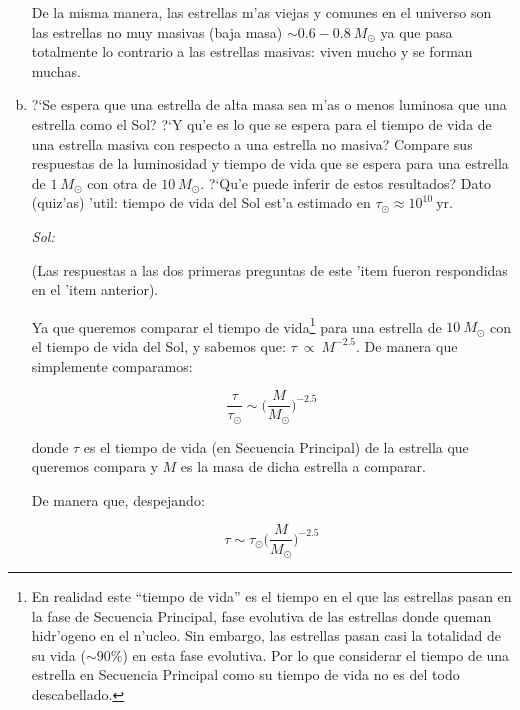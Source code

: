 \documentclass{article}
\begin{document}
\begin{enumerate}[a)]
De la misma manera, las estrellas m'as viejas y comunes en el universo son las estrellas no muy masivas (baja masa) $\sim 0.6-0.8 \ M_\odot$ ya que pasa totalmente lo contrario a las estrellas masivas: viven mucho y se forman muchas.


\item ?`Se espera que una estrella de alta masa sea m'as o menos luminosa que una estrella como el Sol? ?`Y qu'e es lo que se espera para el tiempo de vida de una estrella masiva con respecto a una estrella no masiva? Compare sus respuestas de la luminosidad y tiempo de vida que se espera para una estrella de $1 \ M_\odot$ con otra de $10 \ M_\odot$. ?`Qu'e puede inferir de estos resultados? Dato (quiz'as) 'util: %
tiempo de vida del Sol est'a estimado en $\tau_\odot \approx 10^{10} \ \text{yr}$.

\vspace{2mm}
\emph{Sol:}
\vspace{2mm}

(Las respuestas a las dos primeras  preguntas de este 'item fueron respondidas en el 'item anterior).

Ya que queremos comparar el tiempo de vida\footnote{En realidad este ``tiempo de vida'' es el tiempo en el que las estrellas pasan en la fase de Secuencia Principal, fase evolutiva de las estrellas donde queman hidr'ogeno en el n'ucleo. Sin embargo, las estrellas pasan casi la totalidad de su vida ($\sim 90\%$) en esta fase evolutiva. Por lo que considerar el tiempo de una estrella en Secuencia Principal como su tiempo de vida no es del todo descabellado.} para una estrella de $10 \ M_\odot$ con el tiempo de vida del Sol, y sabemos que: $\tau \ \propto \ M^{-2.5}$. De manera que simplemente comparamos:

\begin{equation}
\frac{\tau}{\tau_\odot} \sim \bigg( \frac{M}{M_\odot} \bigg)^{-2.5}
\end{equation}

donde $\tau$ es el tiempo de vida (en Secuencia Principal) de la estrella que queremos compara y $M$ es la masa de dicha estrella a comparar.

De manera que, despejando:

\begin{equation}
\tau \sim \tau_\odot \bigg( \frac{M}{M_\odot} \bigg)^{-2.5}
\end{equation}


\end{enumerate}
\end{document}
